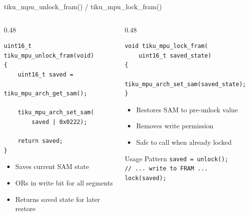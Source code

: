 \documentclass[aspectratio=169, 10pt]{beamer}
\begin{document}
\begin{frame}[fragile]{tiku\_mpu\_unlock\_fram() / tiku\_mpu\_lock\_fram()}
\begin{columns}[T]
\begin{column}{0.48\textwidth}
\begin{lstlisting}[style=cstyle, title={Unlock: enable writes}]
uint16_t tiku_mpu_unlock_fram(void)
{
    uint16_t saved =
        tiku_mpu_arch_get_sam();

    tiku_mpu_arch_set_sam(
        saved | 0x0222);

    return saved;
}
\end{lstlisting}

\begin{itemize}
  \item Saves current SAM state
  \item ORs in write bit for all segments
  \item Returns saved state for later restore
\end{itemize}
\end{column}

\begin{column}{0.48\textwidth}
\begin{lstlisting}[style=cstyle, title={Lock: restore state}]
void tiku_mpu_lock_fram(
    uint16_t saved_state)
{
    tiku_mpu_arch_set_sam(saved_state);
}
\end{lstlisting}

\begin{itemize}
  \item Restores SAM to pre-unlock value
  \item Removes write permission
  \item Safe to call when already locked
\end{itemize}

\vspace{0.5em}
\begin{block}{Usage Pattern}
\texttt{saved = unlock();}\\
\texttt{// ... write to FRAM ...}\\
\texttt{lock(saved);}
\end{block}
\end{column}
\end{columns}
\end{frame}
\end{document}
